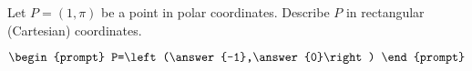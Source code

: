 \documentclass{ximera}
\author{Gregory Hartman \and Matthew Carr}
\begin{document}
\begin{exercise}





Let $P=(1,\pi)$ be a point in polar coordinates. Describe $P$ in rectangular (Cartesian) coordinates.

\[
\begin{prompt}
P=\left(\answer{-1},\answer{0}\right)
\end{prompt}
\]

\end{exercise}
\end{document}
